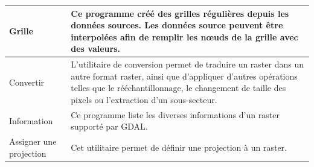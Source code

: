 {\begin{longtable}{|p{3cm}|p{13cm}|}
\hline Grille & Ce programme créé des grilles régulières depuis les données sources. Les données source peuvent être interpolées afin de remplir les n\oe{}uds de la grille avec des valeurs.\\
\hline Convertir & L'utilitaire de conversion permet de traduire un raster dans un autre format raster, ainsi que d'appliquer d'autres opérations telles que le rééchantillonnage, le changement de taille des pixels ou l'extraction d'un sous-secteur.\\
\hline Information & Ce programme liste les diverses informations d'un raster supporté par GDAL.\\
\hline Assigner une projection & Cet utilitaire permet de définir une projection à un raster.\\

\end{longtable}}
